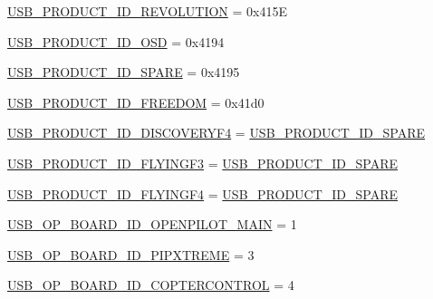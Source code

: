 \begin{DoxyCompactItemize}
\item 
\hyperlink{group___p_i_o_s___u_s_b___d_e_f_s_gaa07282bc8e711d5631b861a8afe6014f}{U\-S\-B\-\_\-\-P\-R\-O\-D\-U\-C\-T\-\_\-\-I\-D\-\_\-\-R\-E\-V\-O\-L\-U\-T\-I\-O\-N} = 0x415\-E
\item 
\hyperlink{group___p_i_o_s___u_s_b___d_e_f_s_ga0d8c174bc113f139b562721418dcf51a}{U\-S\-B\-\_\-\-P\-R\-O\-D\-U\-C\-T\-\_\-\-I\-D\-\_\-\-O\-S\-D} = 0x4194
\item 
\hyperlink{group___p_i_o_s___u_s_b___d_e_f_s_gaf82c7dc922fae0cffa60e95acc05b46c}{U\-S\-B\-\_\-\-P\-R\-O\-D\-U\-C\-T\-\_\-\-I\-D\-\_\-\-S\-P\-A\-R\-E} = 0x4195
\item 
\hyperlink{group___p_i_o_s___u_s_b___d_e_f_s_ga57db1fdaa0e9bbaf565aaccd96f44251}{U\-S\-B\-\_\-\-P\-R\-O\-D\-U\-C\-T\-\_\-\-I\-D\-\_\-\-F\-R\-E\-E\-D\-O\-M} = 0x41d0
\item 
\hyperlink{group___p_i_o_s___u_s_b___d_e_f_s_ga0285a5935c9e1b917d56f3390abb7517}{U\-S\-B\-\_\-\-P\-R\-O\-D\-U\-C\-T\-\_\-\-I\-D\-\_\-\-D\-I\-S\-C\-O\-V\-E\-R\-Y\-F4} = \hyperlink{group___p_i_o_s___u_s_b___d_e_f_s_gaf82c7dc922fae0cffa60e95acc05b46c}{U\-S\-B\-\_\-\-P\-R\-O\-D\-U\-C\-T\-\_\-\-I\-D\-\_\-\-S\-P\-A\-R\-E}
\item 
\hyperlink{group___p_i_o_s___u_s_b___d_e_f_s_gaf04d136e7427c1cacd8b966f5629208d}{U\-S\-B\-\_\-\-P\-R\-O\-D\-U\-C\-T\-\_\-\-I\-D\-\_\-\-F\-L\-Y\-I\-N\-G\-F3} = \hyperlink{group___p_i_o_s___u_s_b___d_e_f_s_gaf82c7dc922fae0cffa60e95acc05b46c}{U\-S\-B\-\_\-\-P\-R\-O\-D\-U\-C\-T\-\_\-\-I\-D\-\_\-\-S\-P\-A\-R\-E}
\item 
\hyperlink{group___p_i_o_s___u_s_b___d_e_f_s_ga987acf80d4e9c88c4e1621d5215c1f58}{U\-S\-B\-\_\-\-P\-R\-O\-D\-U\-C\-T\-\_\-\-I\-D\-\_\-\-F\-L\-Y\-I\-N\-G\-F4} = \hyperlink{group___p_i_o_s___u_s_b___d_e_f_s_gaf82c7dc922fae0cffa60e95acc05b46c}{U\-S\-B\-\_\-\-P\-R\-O\-D\-U\-C\-T\-\_\-\-I\-D\-\_\-\-S\-P\-A\-R\-E}
\item 
\hyperlink{group___p_i_o_s___u_s_b___d_e_f_s_ga593ac31097712501cf540cb304957cd9}{U\-S\-B\-\_\-\-O\-P\-\_\-\-B\-O\-A\-R\-D\-\_\-\-I\-D\-\_\-\-O\-P\-E\-N\-P\-I\-L\-O\-T\-\_\-\-M\-A\-I\-N} = 1
\item 
\hyperlink{group___p_i_o_s___u_s_b___d_e_f_s_ga45e12a7abdf8972bd81fd6ed15a6ba8a}{U\-S\-B\-\_\-\-O\-P\-\_\-\-B\-O\-A\-R\-D\-\_\-\-I\-D\-\_\-\-P\-I\-P\-X\-T\-R\-E\-M\-E} = 3
\item 
\hyperlink{group___p_i_o_s___u_s_b___d_e_f_s_ga2afd7c867dd287434af691f95fa05e1e}{U\-S\-B\-\_\-\-O\-P\-\_\-\-B\-O\-A\-R\-D\-\_\-\-I\-D\-\_\-\-C\-O\-P\-T\-E\-R\-C\-O\-N\-T\-R\-O\-L} = 4

\end{DoxyCompactItemize}
